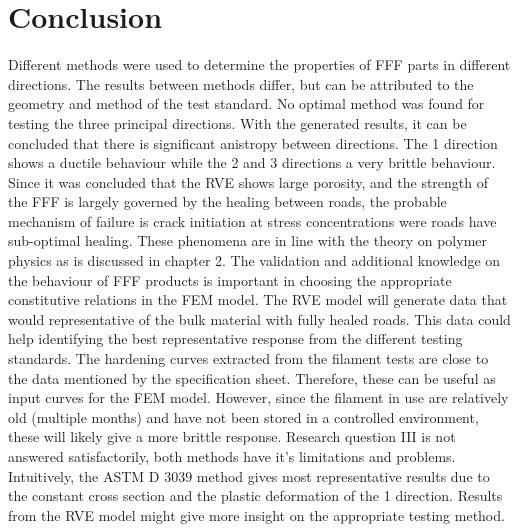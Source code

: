 \section{Conclusion}
Different methods were used to determine the properties of FFF parts in different directions. The results between methods differ, but can be attributed to the geometry and method of the test standard. No optimal method was found for testing the three principal directions. With the generated results, it can be concluded that there is significant anistropy  between directions. The 1 direction shows a ductile behaviour while the 2 and 3 directions a very brittle behaviour. Since it was concluded that the RVE shows large porosity, and the strength of the FFF is largely governed by the healing  between roads, the probable mechanism of failure is crack initiation at stress concentrations were roads have sub-optimal healing. These phenomena are in line with the theory on polymer physics as is discussed in chapter 2. The validation and additional knowledge on the behaviour of FFF products is important in choosing the appropriate constitutive relations in the FEM model.  
The RVE model will generate data that would representative of the bulk material with fully healed roads. This data could help identifying the best representative response from the different testing standards.
The hardening curves extracted from the filament tests are close to the data mentioned by the specification sheet. Therefore, these can be useful as input curves for the FEM model. However, since the filament in use are relatively old (multiple months) and have not been stored in a controlled environment, these will likely give a more brittle response. 
Research question III is not answered satisfactorily, both methods have it's limitations and problems. Intuitively, the ASTM D 3039 method gives most representative results due to the constant cross section and the plastic deformation of the 1 direction. Results from the RVE model might give more insight on the appropriate testing method. 

